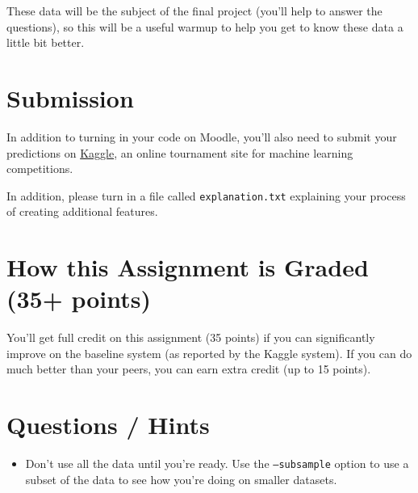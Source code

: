 \documentclass[11pt]{article}
\begin{document}
These data will be the subject of the final project (you'll help to answer the questions), so this will be a useful warmup to help you get to know these data a little bit better.

\section*{Submission}

In addition to turning in your code on Moodle, you'll also need to submit your predictions on \href{https://inclass.kaggle.com/c/digging-into-data-hw2-predict-2013-home-prices}{Kaggle}, an online tournament site for machine learning competitions.  

In addition, please turn in a file called \texttt{explanation.txt} explaining your process of creating additional features.

\section*{How this Assignment is Graded (35+ points)}

You'll get full credit on this assignment (35 points) if you can significantly improve on the baseline system (as reported by the Kaggle system).  If you can do much better than your peers, you can earn extra credit (up to 15 points).

\section*{Questions / Hints}

\begin{itemize}
	\item Don't use all the data until you're ready.  Use the \texttt{--subsample} option to use a subset of the data to see how you're doing on smaller datasets.
\end{itemize}
\end{document}
